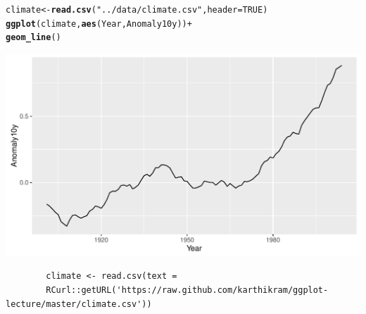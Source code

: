 \documentclass{beamer}\usepackage[]{graphicx}\usepackage[]{color}
\makeatletter
\newcommand{\hlnum}[1]{\textcolor[rgb]{0.686,0.059,0.569}{#1}}%
\newcommand{\hlstr}[1]{\textcolor[rgb]{0.192,0.494,0.8}{#1}}%
\newcommand{\hlopt}[1]{\textcolor[rgb]{0,0,0}{#1}}%
\newcommand{\hlstd}[1]{\textcolor[rgb]{0.345,0.345,0.345}{#1}}%
\newcommand{\hlkwb}[1]{\textcolor[rgb]{0.69,0.353,0.396}{#1}}%
\newcommand{\hlkwc}[1]{\textcolor[rgb]{0.333,0.667,0.333}{#1}}%
\newcommand{\hlkwd}[1]{\textcolor[rgb]{0.737,0.353,0.396}{\textbf{#1}}}%
\newenvironment{kframe}{%
 \def\at@end@of@kframe{}%
 \ifinner\ifhmode%
  \def\at@end@of@kframe{\end{minipage}}%
  \begin{minipage}{\columnwidth}%
 \fi\fi%
 \def\FrameCommand##1{\hskip\@totalleftmargin \hskip-\fboxsep
 \colorbox{shadecolor}{##1}\hskip-\fboxsep
     \hskip-\linewidth \hskip-\@totalleftmargin \hskip\columnwidth}%
 \MakeFramed {\advance\hsize-\width
   \@totalleftmargin\z@ \linewidth\hsize
   \@setminipage}}%
 {\par\unskip\endMakeFramed%
 \at@end@of@kframe}
\newenvironment{knitrout}{}{} %
\makeatother
\begin{document}
\begin{frame}[fragile]
\begin{knitrout}\footnotesize
{}\color{fgcolor}\begin{kframe}
\begin{alltt}
\hlstd{climate} \hlkwb{<-} \hlkwd{read.csv}\hlstd{(}\hlstr{"../data/climate.csv"}\hlstd{,} \hlkwc{header} \hlstd{=} \hlnum{TRUE}\hlstd{)}
\hlkwd{ggplot}\hlstd{(climate,} \hlkwd{aes}\hlstd{(Year, Anomaly10y))} \hlopt{+}
    \hlkwd{geom_line}\hlstd{()}
\end{alltt}
\end{kframe}

{\centering \includegraphics[width=.75\linewidth]{figure/linea-1} 

}



\end{knitrout}
\begin{flushright}
\begingroup
    \fontsize{6pt}{12pt}\selectfont
    \begin{verbatim}
        climate <- read.csv(text =
        RCurl::getURL('https://raw.github.com/karthikram/ggplot-lecture/master/climate.csv'))
    \end{verbatim}
\endgroup
\end{flushright}
\end{frame}

\end{document}
